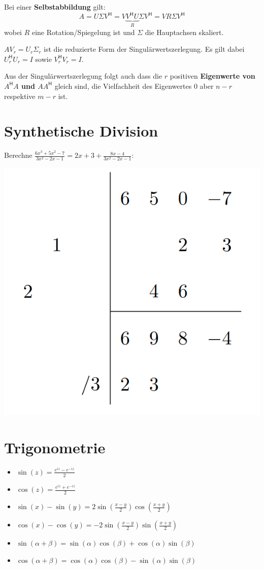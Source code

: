 \documentclass[a4paper,10pt]{article}
\newcommand*{\hermconj}{\mathsf{H}}
\begin{document}
Bei einer \textbf{Selbstabbildung} gilt:
$$A = U \Sigma V^\hermconj = V \underbrace{V^\hermconj U}_R \Sigma V^\hermconj = V R \Sigma V^\hermconj$$
wobei $R$ eine Rotation/Spiegelung ist und $\Sigma$ die Hauptachsen skaliert.

$A V_r = U_r \Sigma_r$ ist die reduzierte Form der Singulärwertszerlegung. Es gilt dabei $U_r^\hermconj U_r = I$ sowie $V_r^\hermconj V_r = I$.

Aus der Singulärwertszerlegung folgt auch dass die $r$ positiven \textbf{Eigenwerte von $A^\hermconj A$ und $AA^\hermconj$} gleich sind, die Vielfachheit des Eigenwertes $0$ aber $n-r$ respektive $m-r$ ist.

\section{Synthetische Division}
Berechne $\frac{6x^3 + 5x^2 - 7}{3x^2 - 2x - 1} = 2x + 3 + \frac{8x - 4}{3x^2 -2x - 1}$:\\
\begin{center}
  \includegraphics[width=0.4 \linewidth]{synthetic-division.png}
\end{center}

\section{Trigonometrie}

\begin{itemize}
  \item $\sin(z) = \frac{e^{iz} - e^{-iz}}{2}$
  \item $\cos(z) = \frac{e^{iz} + e^{-iz}}{2}$
  \item $\sin(x) - \sin(y) = 2\sin(\frac{x - y}{2})\cos(\frac{x + y}{2})$
  \item $\cos(x) - \cos(y) = -2\sin(\frac{x - y}{2})\sin(\frac{x + y}{2})$
  \item $\sin(\alpha + \beta) = \sin(\alpha) \cos(\beta) + \cos(\alpha) \sin(\beta)$
  \item $\cos(\alpha + \beta) = \cos(\alpha) \cos(\beta) - \sin(\alpha) \sin(\beta)$
\end{itemize}
\end{document}
